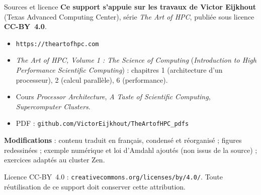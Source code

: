 \documentclass[8pt,aspectratio=169]{beamer}
\begin{document}
\begin{frame}{Sources et licence}
\textbf{Ce support s'appuie sur les travaux de Victor Eijkhout} (Texas Advanced Computing Center), série \emph{The Art of HPC}, publiée sous licence \textbf{CC-BY~4.0}.

\medskip
\begin{itemize}
\item \texttt{https://theartofhpc.com}
\item \emph{The Art of HPC, Volume 1 : The Science of Computing} (\emph{Introduction to High Performance Scientific Computing}) : chapitres 1 (architecture d'un processeur), 2 (calcul parallèle), 6 (performance).
\item Cours \emph{Processor Architecture}, \emph{A Taste of Scientific Computing}, \emph{Supercomputer Clusters}.
\item PDF : \texttt{github.com/VictorEijkhout/TheArtofHPC\_pdfs}
\end{itemize}

\medskip
\textbf{Modifications} : contenu traduit en français, condensé et réorganisé ; figures redessinées ; exemple numérique et loi d'Amdahl ajoutés (non issus de la source) ; exercices adaptés au cluster Zen.

\bigskip
{\scriptsize Licence CC-BY~4.0 : \texttt{creativecommons.org/licenses/by/4.0/}. Toute réutilisation de ce support doit conserver cette attribution.}
\end{frame}
\end{document}

